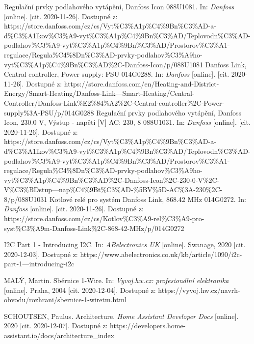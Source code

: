 \begin{thebibliography}{3}
Regulační prvky podlahového vytápění, Danfoss Icon 088U1081. In: \textit{Danfoss} [online]. [cit. 2020-11-26]. Dostupné z: https://store.danfoss.com/cz/cs/Vyt\%C3\%A1p\%C4\%9Bn\%C3\%AD-a-d\%C3\%A1lkov\%C3\%A9-vyt\%C3\%A1p\%C4\%9Bn\%C3\%AD/Teplovodn\%C3\%AD-podlahov\%C3\%A9-vyt\%C3\%A1p\%C4\%9Bn\%C3\%AD/Prostorov\%C3\%A1-regulace/Regula\%C4\%8Dn\%C3\%AD-prvky-podlahov\%C3\%A9ho-vyt\%C3\%A1p\%C4\%9Bn\%C3\%AD\%2C-Danfoss-Icon/p/088U1081
Danfoss Link, Central controller, Power supply: PSU 014G0288. In: \textit{Danfoss} [online]. [cit. 2020-11-26]. Dostupné z: https://store.danfoss.com/en/Heating-and-District-Energy/Smart-Heating/Danfoss-Link---Smart-Heating/Central-Controller/Danfoss-Link\%E2\%84\%A2\%2C-Central-controller\%2C-Power-supply\%3A-PSU/p/014G0288
Regulační prvky podlahového vytápění, Danfoss Icon, 230.0 V, Výstup - napětí [V] AC: 230, 8 088U1031. In: \textit{Danfoss} [online]. [cit. 2020-11-26]. Dostupné z: https://store.danfoss.com/cz/cs/Vyt\%C3\%A1p\%C4\%9Bn\%C3\%AD-a-d\%C3\%A1lkov\%C3\%A9-vyt\%C3\%A1p\%C4\%9Bn\%C3\%AD/Teplovodn\%C3\%AD-podlahov\%C3\%A9-vyt\%C3\%A1p\%C4\%9Bn\%C3\%AD/Prostorov\%C3\%A1-regulace/Regula\%C4\%8Dn\%C3\%AD-prvky-podlahov\%C3\%A9ho-vyt\%C3\%A1p\%C4\%9Bn\%C3\%AD\%2C-Danfoss-Icon\%2C-230-0-V\%2C-V\%C3\%BDstup---nap\%C4\%9Bt\%C3\%AD-\%5BV\%5D-AC\%3A-230\%2C-8/p/088U1031
Kotlové relé pro systém Danfoss Link, 868.42 MHz 014G0272. In: \textit{Danfoss} [online]. [cit. 2020-11-26]. Dostupné z: https://store.danfoss.com/cz/cs/Kotlov\%C3\%A9-rel\%C3\%A9-pro-syst\%C3\%A9m-Danfoss-Link\%2C-868-42-MHz/p/014G0272

I2C Part 1 - Introducing I2C. In: \textit{ABelectronics UK} [online]. Swanage, 2020 [cit. 2020-12-03]. Dostupné z: https://www.abelectronics.co.uk/kb/article/1090/i2c-part-1---introducing-i2c

MALÝ, Martin. Sběrnice 1-Wire. In: \textit{Vyvoj.hw.cz: profesionální elektronika} [online]. Praha, 2004 [cit. 2020-12-04]. Dostupné z: https://vyvoj.hw.cz/navrh-obvodu/rozhrani/sbernice-1-wiretm.html

SCHOUTSEN, Paulus. Architecture. \textit{Home Assistant Developer Docs} [online]. 2020 [cit. 2020-12-07]. Dostupné z: https://developers.home-assistant.io/docs/architecture\_index






\end{thebibliography}